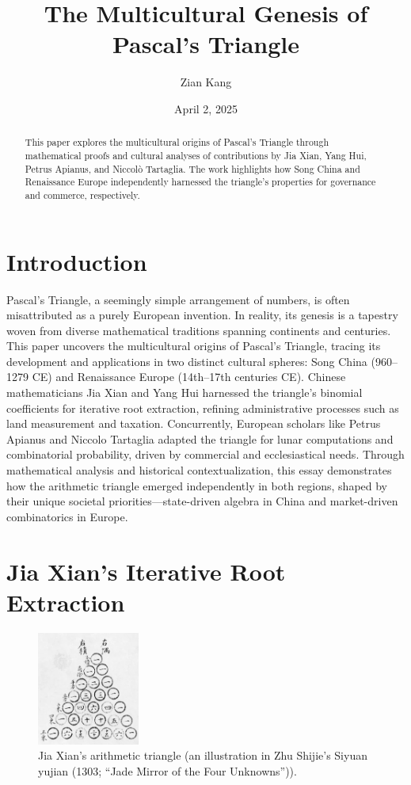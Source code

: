 \documentclass{article}
\title{The Multicultural Genesis of Pascal’s Triangle}
\author{Zian Kang}
\date{April 2, 2025}
\begin{document}
\maketitle

\begin{abstract}
This paper explores the multicultural origins of Pascal’s Triangle through mathematical proofs and cultural analyses of contributions by Jia Xian, Yang Hui, Petrus Apianus, and Niccolò Tartaglia. The work highlights how Song China and Renaissance Europe independently harnessed the triangle’s properties for governance and commerce, respectively.
\end{abstract}

\section{Introduction}

Pascal’s Triangle, a seemingly simple arrangement of numbers, is often misattributed as a purely European invention. In reality, its genesis is a tapestry woven from diverse mathematical traditions spanning continents and centuries. This paper uncovers the multicultural origins of Pascal’s Triangle, tracing its development and applications in two distinct cultural spheres: Song China (960–1279 CE) and Renaissance Europe (14th–17th centuries CE). Chinese mathematicians Jia Xian and Yang Hui harnessed the triangle’s binomial coefficients for iterative root extraction, refining administrative processes such as land measurement and taxation. Concurrently, European scholars like Petrus Apianus and Niccolo Tartaglia adapted the triangle for lunar computations and combinatorial probability, driven by commercial and ecclesiastical needs. Through mathematical analysis and historical contextualization, this essay demonstrates how the arithmetic triangle emerged independently in both regions, shaped by their unique societal priorities—state-driven algebra in China and market-driven combinatorics in Europe.

\section{Jia Xian’s Iterative Root Extraction}

\begin{figure}[h!tbp]
\centering
\includegraphics[width=0.3\textwidth]{Essay/Draft_2/Jiaxian.png}
\caption{Jia Xian’s arithmetic triangle (an illustration in Zhu Shijie's Siyuan yujian (1303; “Jade Mirror of the Four Unknowns”)).}
\label{fig:jia}
\end{figure}
\end{document}
